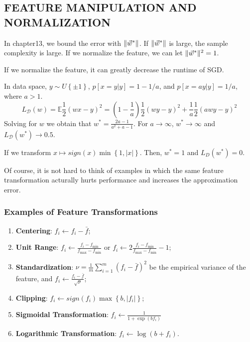 \subsection{FEATURE MANIPULATION AND NORMALIZATION}%
\label{sub:feature_manipulation_and_normalization}

In chapter13, we bound the error with $ \Arrowvert \vec{w}^* \Arrowvert $. If $ \Arrowvert \vec{w}^* \Arrowvert $ is large, the sample complexity is large. If we normalize the feature, we can let $ \Arrowvert \vec{w}^* \Arrowvert^2 = 1 $.

If we normalize the feature, it can greatly decrease the runtime of {SGD}.

\begin{example}
    In data space, $ y \sim U\left\{ \pm 1 \right\} $, $ p[x = y | y] = 1 - 1/a $, and $ p[x = ay | y] = 1/a $, where $ a > 1 $.
    \[
        L_{\mathcal{D}}(w) = \mathbb{E} \frac{1}{2} {(wx - y)}^2
        = \left( 1 - \frac{1}{a}  \right) \frac{1}{2} {(wy - y)}^2 + \frac{1}{a} \frac{1}{2} {(a wy - y)}^2
    \]
    Solving for $ w $ we obtain that $ w^* = \frac{2a - 1}{a^2 + a - 1} $. For $ a \rightarrow \infty $, $ w^* \rightarrow \infty $ and $ L_{\mathcal{D}}(w^*) \rightarrow 0.5 $.

    If we transform $ x \mapsto sign(x) \min\left\{ 1, \left| x \right| \right\}. $ Then, $ w^* = 1 $ and $ L_{D}(w^*) = 0 $.
\end{example}

Of course, it is not hard to think of examples in which the same feature transformation acturally hurts performance and increases the approximation error.

\subsubsection{Examples of Feature Transformations}%

\begin{enumerate}
    \item \textbf{Centering}: $ f_i \leftarrow f_i - \bar f $;
    \item \textbf{Unit Range}: $ f_i \leftarrow \frac{f_i - f_{\min}}{f_{\max} - f_{\min}}  $ or $ f_i \leftarrow 2 \frac{f_i - f_{\min}}{f_{\max} - f_{\min}} - 1 $;
    \item \textbf{Standardization}: $ \nu = \frac{1}{m} \sum^{m}_{i=1} {(f_i - \bar f)}^2 $ be the empirical variance of the feature, and $ f_i \leftarrow \frac{f_i - \bar f}{\sqrt \nu}  $;
    \item \textbf{Clipping}: $ f_i \leftarrow sign(f_i) \max \left\{ b, \left| f_i \right| \right\} $;
    \item \textbf{Sigmoidal Transformation}: $ f_i \leftarrow \frac{1}{1 + \exp{(b f_i)}}  $
    \item \textbf{Logarithmic Transformation}: $ f_i \leftarrow \log(b + f_i) $.
\end{enumerate}

